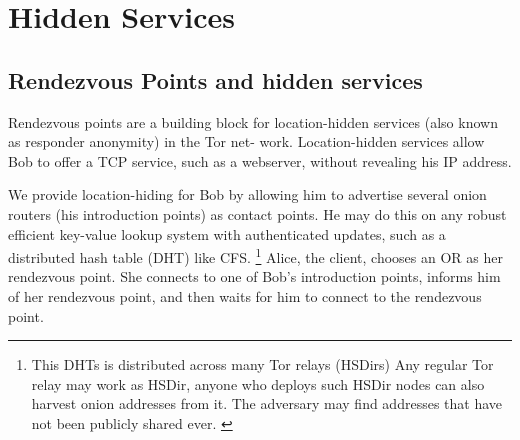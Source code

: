 
\chapter{Hidden Services}

\section{Rendezvous Points and hidden services}
Rendezvous points are a building block for location-hidden services (also known as responder anonymity) in the Tor net- work. Location-hidden services allow Bob to offer a TCP service, such as a webserver, without revealing his IP address.\cite{tor_paper}

We provide location-hiding for Bob by allowing him to advertise several onion routers (his introduction points) as contact points.\cite{tor_paper}
He may do this on any robust efficient key-value lookup system with authenticated updates, such as a distributed hash table (DHT) like CFS.\cite{tor_paper} \footnote{ This DHTs is distributed across many Tor relays (HSDirs) Any regular Tor relay may work as HSDir, anyone who deploys such HSDir nodes can also harvest onion addresses from it. The adversary may find addresses that have not been publicly shared ever. \cite{tor_slideshare}}
Alice, the client, chooses an OR as her rendezvous point. She connects to one of Bob’s introduction points, informs him of her rendezvous point, and then waits for him to connect to the rendezvous point.\cite{tor_paper}
